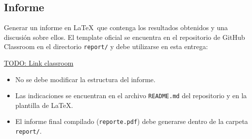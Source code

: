 \newpage
\subsection{Informe} \label{subsec:report}

Generar un informe en \LaTeX\ que contenga los resultados obtenidos y una discusión sobre ellos.  
El template oficial se encuentra en el repositorio de GitHub Classroom en el directorio \texttt{report/} y debe utilizarse en esta entrega:

\begin{mdframed}
\begin{center}
    \url{TODO: Link classroom}
\end{center}
\end{mdframed}

\begin{itemize}
    \item No se debe modificar la estructura del informe.
    \item Las indicaciones se encuentran en el archivo \texttt{README.md} del repositorio y en la plantilla de \LaTeX.
    \item El informe final compilado (\texttt{reporte.pdf}) debe generarse dentro de la carpeta \texttt{report/}.
\end{itemize}
